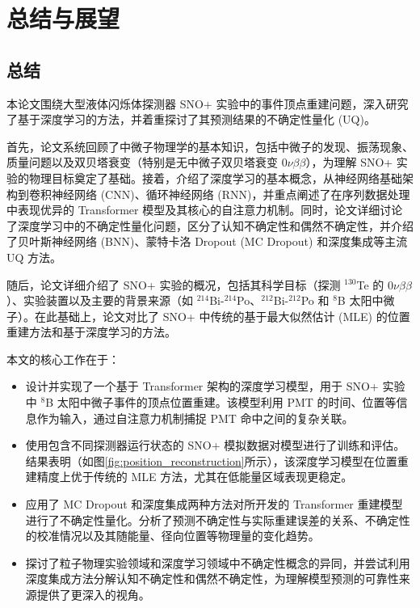 \chapter{总结与展望}

\section{总结}

本论文围绕大型液体闪烁体探测器 SNO+ 实验中的事件顶点重建问题，深入研究了基于深度学习的方法，并着重探讨了其预测结果的不确定性量化 (UQ)。

首先，论文系统回顾了中微子物理学的基本知识，包括中微子的发现、振荡现象、质量问题以及双贝塔衰变（特别是无中微子双贝塔衰变 $0\nu\beta\beta$），为理解 SNO+ 实验的物理目标奠定了基础。接着，介绍了深度学习的基本概念，从神经网络基础架构到卷积神经网络 (CNN)、循环神经网络 (RNN)，并重点阐述了在序列数据处理中表现优异的 Transformer 模型及其核心的自注意力机制。同时，论文详细讨论了深度学习中的不确定性量化问题，区分了认知不确定性和偶然不确定性，并介绍了贝叶斯神经网络 (BNN)、蒙特卡洛 Dropout (MC Dropout) 和深度集成等主流 UQ 方法。

随后，论文详细介绍了 SNO+ 实验的概况，包括其科学目标（探测 ${}^{130}$Te 的 $0\nu\beta\beta$）、实验装置以及主要的背景来源（如 ${}^{214}$Bi-${}^{214}$Po、${}^{212}$Bi-${}^{212}$Po 和 ${}^{8}$B 太阳中微子）。在此基础上，论文对比了 SNO+ 中传统的基于最大似然估计 (MLE) 的位置重建方法和基于深度学习的方法。

本文的核心工作在于：
\begin{itemize}
    \item 设计并实现了一个基于 Transformer 架构的深度学习模型，用于 SNO+ 实验中 ${}^{8}$B 太阳中微子事件的顶点位置重建。该模型利用 PMT 的时间、位置等信息作为输入，通过自注意力机制捕捉 PMT 命中之间的复杂关联。
    \item 使用包含不同探测器运行状态的 SNO+ 模拟数据对模型进行了训练和评估。结果表明（如图\ref{fig:position_reconstruction}所示），该深度学习模型在位置重建精度上优于传统的 MLE 方法，尤其在低能量区域表现更稳定。
    \item 应用了 MC Dropout 和深度集成两种方法对所开发的 Transformer 重建模型进行了不确定性量化。分析了预测不确定性与实际重建误差的关系、不确定性的校准情况以及其随能量、径向位置等物理量的变化趋势。
    \item 探讨了粒子物理实验领域和深度学习领域中不确定性概念的异同，并尝试利用深度集成方法分解认知不确定性和偶然不确定性，为理解模型预测的可靠性来源提供了更深入的视角。
\end{itemize}

